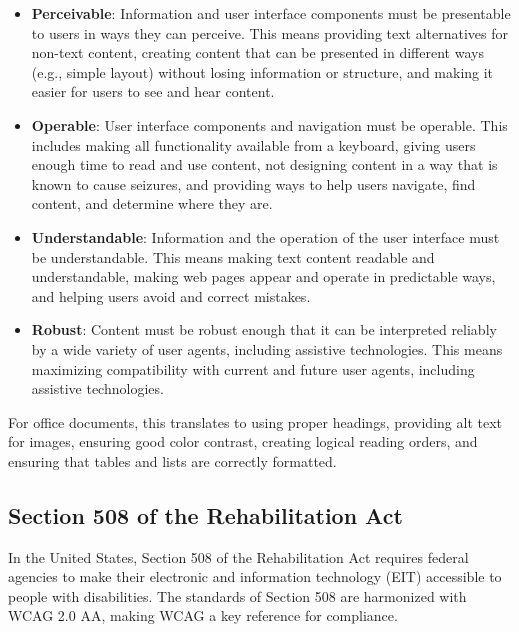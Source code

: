 \begin{itemize}
	\item \textbf{Perceivable}: Information and user interface components must be presentable to users in ways they can perceive. This means providing text alternatives for non-text content, creating content that can be presented in different ways (e.g., simple layout) without losing information or structure, and making it easier for users to see and hear content.
	\item \textbf{Operable}: User interface components and navigation must be operable. This includes making all functionality available from a keyboard, giving users enough time to read and use content, not designing content in a way that is known to cause seizures, and providing ways to help users navigate, find content, and determine where they are.
	\item \textbf{Understandable}: Information and the operation of the user interface must be understandable. This means making text content readable and understandable, making web pages appear and operate in predictable ways, and helping users avoid and correct mistakes.
	\item \textbf{Robust}: Content must be robust enough that it can be interpreted reliably by a wide variety of user agents, including assistive technologies. This means maximizing compatibility with current and future user agents, including assistive technologies.
\end{itemize}

For office documents, this translates to using proper headings, providing alt text for images, ensuring good color contrast, creating logical reading orders, and ensuring that tables and lists are correctly formatted.

\subsection{Section 508 of the Rehabilitation Act}
\label{subsec:section-508-office}
In the United States, Section 508 of the Rehabilitation Act requires federal agencies to make their electronic and information technology (EIT) accessible to people with disabilities. The standards of Section 508 are harmonized with WCAG 2.0 AA, making WCAG a key reference for compliance.

